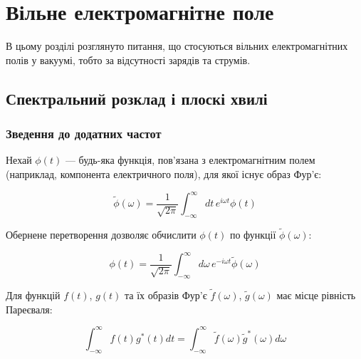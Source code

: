 
\chapter{Вільне електромагнітне поле}\label{\currfilebase}


В цьому розділі розглянуто питання, що стосуються вільних електромагнітних полів у вакуумі, тобто за відсутності зарядів та струмів.


\section{Спектральний розклад і плоскі хвилі}


\subsection*{Зведення до додатних частот}

Нехай $\phi(t)$ --- будь-яка функція, пов’язана з електромагнітним полем (наприклад, компонента електричного поля), для якої існує образ Фур’є:

\begin{equation}
\tilde{\phi}(\omega) = \frac{1}{\sqrt{2\pi}} \int_{-\infty}^{\infty} dt \, e^{i\omega t} \phi(t)
\label{eq:fourier_transform}
\end{equation}

Обернене перетворення дозволяє обчислити $\phi(t)$ по функції $\tilde{\phi}(\omega)$:

\begin{equation}
\phi(t) = \frac{1}{\sqrt{2\pi}} \int_{-\infty}^{\infty} d\omega \, e^{-i\omega t} \tilde{\phi}(\omega)
\label{eq:inverse_fourier_transform}
\end{equation}

Для функцій $f(t)$, $g(t)$ та їх образів Фур’є $\tilde{f}(\omega)$, $\tilde{g}(\omega)$ має місце рівність Пареєваля:

\begin{equation}
\int_{-\infty}^{\infty} f(t)g^{*}(t)dt = \int_{-\infty}^{\infty} \tilde{f}(\omega)\tilde{g}^{*}(\omega)d\omega
\label{eq:parseval}
\end{equation}

